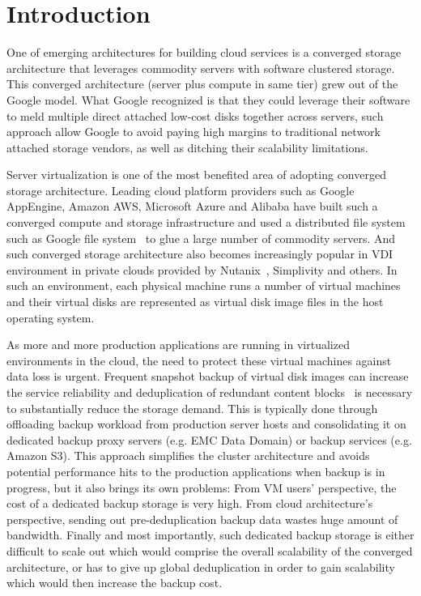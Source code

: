 \section{Introduction}

One of emerging architectures for building cloud services
is a converged storage architecture that leverages commodity servers with software clustered storage.
This converged architecture (server plus compute in same tier) grew out of the Google model. 
What Google recognized is that they could leverage their software to 
meld multiple direct attached low-cost disks together across servers, 
such approach allow Google to avoid paying high margins to traditional network attached storage vendors,
as well as ditching their scalability limitations. 

Server virtualization is one of the most benefited area of adopting converged storage architecture.
Leading cloud platform providers such as Google AppEngine, Amazon AWS, 
Microsoft Azure and Alibaba have built such a converged compute and storage infrastructure and used
a distributed file system such as Google file system~\cite{googlefs03,hdfs10}
to glue a large number of commodity servers.
And such converged storage architecture also becomes increasingly popular 
in VDI environment in private clouds
provided by Nutanix~\cite{NutanixPaper}, Simplivity and others. 
In such an environment,
each physical machine runs a number  of virtual machines 
and their virtual disks are represented as virtual disk image files in the host operating system.

As more and more production 
applications are running in virtualized environments in the cloud,
the need to protect these virtual machines against data loss is urgent.
Frequent snapshot backup of virtual disk images  can increase  the service reliability
and deduplication of redundant content blocks~\cite{venti02,bottleneck08}
 is necessary to substantially reduce the storage demand.
This is typically done through offloading backup workload from production 
server hosts and consolidating it on dedicated backup proxy servers (e.g. EMC Data Domain) or
backup services (e.g. Amazon S3). This approach simplifies the cluster architecture and 
avoids potential performance hits to the production applications when backup is in progress,
but it also brings its own problems:
From VM users' perspective, the cost of a dedicated backup storage is very high.
From cloud architecture's perspective, sending out pre-deduplication backup data wastes huge amount
of bandwidth. Finally and most importantly, such dedicated backup storage is either difficult to scale out
which would comprise the overall scalability of the converged architecture, 
or has to give up global deduplication in order to gain scalability which would then increase the backup cost.

